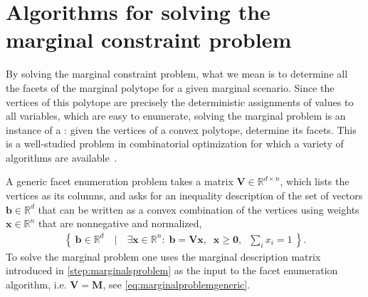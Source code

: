 \documentclass[aps,english,10pt,superscriptaddress,onecolumn,twoside,longbibliography,pra,floatfix,fleqn,nofootinbib]{revtex4-1}%
\newcommand*{\tblue}[1]{{\color{MidnightBlue}{\textbf{#1}}}}
\theoremstyle{definition}
\begin{document}
\appendix
{}
\let\stdsection\section
\renewcommand{\section}{\clearpage\stdsection} %






\section{Algorithms for solving the marginal constraint problem}\label{sec:projalgorithms}

By solving the marginal constraint problem, what we mean is to determine all the facets of the marginal polytope for a given marginal scenario. Since the vertices of this polytope are precisely the deterministic assignments of values to all variables, which are easy to enumerate, solving the marginal problem is an instance of a \tblue{facet enumeration problem}: given the vertices of a convex polytope, determine its facets. This is a well-studied problem in combinatorial optimization for which a variety of algorithms are available~\cite{avis_convexhull_2015}. 

A generic facet enumeration problem takes a matrix $\bm{V}\in\mathbb{R}^{d\times n}$, which lists the vertices as its columns, and asks for an inequality description of the set of vectors $\bm{b}\in\mathbb{R}^d$ that can be written as a convex combination of the vertices using weights $\bm{x}\in\mathbb{R}^n$ that are nonnegative and normalized,
\begin{align}
	\label{projsimplex}
	\left\{\: \bm{b}\in\mathbb{R}^d \quad\bigg|\quad \exists \bm{x}\in\mathbb{R}^n:\; \bm{b} = \bm{V}\bm{x} ,\;\; \bm{x}\geq \bm{0},\;\; {{\sum_i}{x_i}}=1 \:\right\}.
\end{align}
To solve the marginal problem one uses the marginal description matrix introduced in \cref{step:marginalsproblem} as the input to the facet enumeration algorithm, i.e. $\bm{V}=\bm{M}$, see \cref{eq:marginalproblemgeneric}.
\end{document}
